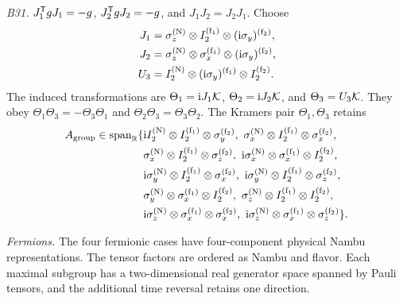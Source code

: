 \medskip\noindent\textit{B31.}\quad
\(J_1^{\mathsf{T}} gJ_1=-g\), \(J_2^{\mathsf{T}} gJ_2=-g\), and
\(J_1J_2=J_2J_1\).
Choose
\begin{equation*}
\begin{aligned}
J_1&=\sigma_z^{({\rm N})}\otimes I_2^{({\rm f}_1)}
       \otimes(\mathrm{i}\sigma_y)^{({\rm f}_2)},\\
J_2&=\sigma_z^{({\rm N})}\otimes\sigma_x^{({\rm f}_1)}
       \otimes(\mathrm{i}\sigma_y)^{({\rm f}_2)},\\
U_3&=I_2^{({\rm N})}\otimes(\mathrm{i}\sigma_y)^{({\rm f}_1)}
       \otimes I_2^{({\rm f}_2)} .
\end{aligned}
\end{equation*}
The induced transformations are \(\Theta_1=\mathrm{i} J_1\mathcal{K}\),
\(\Theta_2=\mathrm{i} J_2\mathcal{K}\), and \(\Theta_3=U_3\mathcal{K}\).
They obey \(\Theta_1\Theta_3=-\Theta_3\Theta_1\) and
\(\Theta_2\Theta_3=\Theta_3\Theta_2\).  The Kramers pair
\(\Theta_1,\Theta_3\) retains
\begin{align*}
A_{\rm group}\in\operatorname{span}_{\mathbb R}\{&
\mathrm{i} I_2^{({\rm N})}\otimes I_2^{({\rm f}_1)}\otimes\sigma_y^{({\rm f}_2)},
\ \sigma_x^{({\rm N})}\otimes I_2^{({\rm f}_1)}\otimes\sigma_x^{({\rm f}_2)},\\
&\sigma_x^{({\rm N})}\otimes I_2^{({\rm f}_1)}\otimes\sigma_z^{({\rm f}_2)},
\ \mathrm{i}\sigma_x^{({\rm N})}\otimes\sigma_x^{({\rm f}_1)}\otimes I_2^{({\rm f}_2)},\\
&\mathrm{i}\sigma_y^{({\rm N})}\otimes I_2^{({\rm f}_1)}\otimes\sigma_x^{({\rm f}_2)},
\ \mathrm{i}\sigma_y^{({\rm N})}\otimes I_2^{({\rm f}_1)}\otimes\sigma_z^{({\rm f}_2)},\\
&\sigma_y^{({\rm N})}\otimes\sigma_x^{({\rm f}_1)}\otimes I_2^{({\rm f}_2)},
\ \sigma_z^{({\rm N})}\otimes I_2^{({\rm f}_1)}\otimes I_2^{({\rm f}_2)},\\
&\mathrm{i}\sigma_z^{({\rm N})}\otimes\sigma_x^{({\rm f}_1)}\otimes\sigma_x^{({\rm f}_2)},
\ \mathrm{i}\sigma_z^{({\rm N})}\otimes\sigma_x^{({\rm f}_1)}\otimes\sigma_z^{({\rm f}_2)}
\}.
\end{align*}

\medskip\noindent\textit{Fermions.}\quad
The four fermionic cases have four-component physical Nambu
representations.  The tensor factors are ordered as Nambu and flavor.  Each
maximal subgroup has a two-dimensional real generator space spanned by Pauli
tensors, and the additional time reversal retains one direction.

